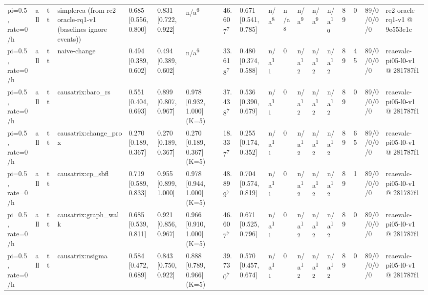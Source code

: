 \begin{table}[t]
\begin{tabular}{llllllllllllllllll}
pi=0.5, rate=0/h & all & tt & simplerca (from re2-oracle-rq1-v1 (baselines ignore events)) & 0.685 [0.556, 0.800] & 0.831 [0.722, 0.922] & n/a\textsuperscript{6} & 46.607\textsuperscript{7} & 0.671 [0.541, 0.785] & n/a\textsuperscript{8} & n/a\textsuperscript{8} & n/a\textsuperscript{9} & n/a\textsuperscript{9} & n/a\textsuperscript{10} & 89 & 0 & 89/0/0/0/0 & re2-oracle-rq1-v1 @ 9e553e1c \\
pi=0.5, rate=0/h & all & tt & naive-change & 0.494 [0.389, 0.602] & 0.494 [0.389, 0.602] & n/a\textsuperscript{6} & 33.618\textsuperscript{7} & 0.480 [0.374, 0.588] & n/a\textsuperscript{11} & 0 & n/a\textsuperscript{12} & n/a\textsuperscript{12} & n/a\textsuperscript{12} & 89 & 45 & 89/0/0/0/0 & rcaevalc-pi05-l0-v1 @ 281787f1 \\
pi=0.5, rate=0/h & all & tt & causatrix:baro\_rs & 0.551 [0.404, 0.693] & 0.899 [0.807, 0.967] & 0.978 [0.932, 1.000] (K=5) & 37.438\textsuperscript{7} & 0.536 [0.390, 0.679] & n/a\textsuperscript{11} & 0 & n/a\textsuperscript{12} & n/a\textsuperscript{12} & n/a\textsuperscript{12} & 89 & 0 & 89/0/0/0/0 & rcaevalc-pi05-l0-v1 @ 281787f1 \\
pi=0.5, rate=0/h & all & tt & causatrix:change\_prox & 0.270 [0.189, 0.367] & 0.270 [0.189, 0.367] & 0.270 [0.189, 0.367] (K=5) & 18.337\textsuperscript{7} & 0.255 [0.174, 0.352] & n/a\textsuperscript{11} & 0 & n/a\textsuperscript{12} & n/a\textsuperscript{12} & n/a\textsuperscript{12} & 89 & 65 & 89/0/0/0/0 & rcaevalc-pi05-l0-v1 @ 281787f1 \\
pi=0.5, rate=0/h & all & tt & causatrix:cp\_sbfl & 0.719 [0.589, 0.833] & 0.955 [0.899, 1.000] & 0.978 [0.944, 1.000] (K=5) & 48.899\textsuperscript{7} & 0.704 [0.574, 0.819] & n/a\textsuperscript{11} & 0 & n/a\textsuperscript{12} & n/a\textsuperscript{12} & n/a\textsuperscript{12} & 89 & 1 & 89/0/0/0/0 & rcaevalc-pi05-l0-v1 @ 281787f1 \\
pi=0.5, rate=0/h & all & tt & causatrix:graph\_walk & 0.685 [0.539, 0.811] & 0.921 [0.856, 0.967] & 0.966 [0.910, 1.000] (K=5) & 46.607\textsuperscript{7} & 0.671 [0.525, 0.796] & n/a\textsuperscript{11} & 0 & n/a\textsuperscript{12} & n/a\textsuperscript{12} & n/a\textsuperscript{12} & 89 & 0 & 89/0/0/0/0 & rcaevalc-pi05-l0-v1 @ 281787f1 \\
pi=0.5, rate=0/h & all & tt & causatrix:nsigma & 0.584 [0.472, 0.689] & 0.843 [0.750, 0.922] & 0.888 [0.789, 0.966] (K=5) & 39.730\textsuperscript{7} & 0.570 [0.457, 0.674] & n/a\textsuperscript{11} & 0 & n/a\textsuperscript{12} & n/a\textsuperscript{12} & n/a\textsuperscript{12} & 89 & 0 & 89/0/0/0/0 & rcaevalc-pi05-l0-v1 @ 281787f1 \\

\end{tabular}
\end{table}
